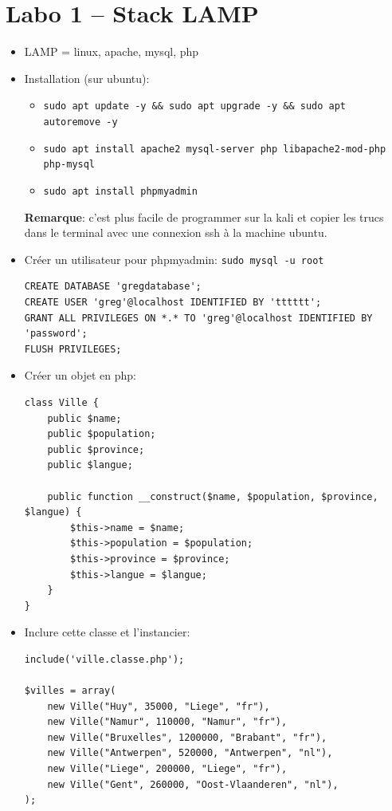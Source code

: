 \documentclass[a4paper]{article}
\begin{document}
\section{Labo 1 -- Stack LAMP}





\begin{itemize}


\item LAMP = linux, apache, mysql, php


\item Installation (sur ubuntu):
\begin{itemize}
    \item \texttt{sudo apt update -y \&\& sudo apt upgrade -y \&\& sudo apt autoremove -y}
    \item \texttt{sudo apt install apache2 mysql-server php  libapache2-mod-php php-mysql}
    \item \texttt{sudo apt install phpmyadmin}
\end{itemize}
\textbf{Remarque}: c'est plus facile de programmer sur la kali et copier les trucs dans le terminal avec une connexion ssh à la machine ubuntu.


\item Créer un utilisateur pour phpmyadmin: \texttt{sudo mysql -u root}
\begin{lstlisting}[style=sql]
CREATE DATABASE 'gregdatabase';
CREATE USER 'greg'@localhost IDENTIFIED BY 'tttttt';
GRANT ALL PRIVILEGES ON *.* TO 'greg'@localhost IDENTIFIED BY 'password';
FLUSH PRIVILEGES;
\end{lstlisting}


\item Créer un objet en php:
\begin{lstlisting}[style=php]
class Ville {
	public $name;
	public $population;
	public $province;
	public $langue;

	public function __construct($name, $population, $province, $langue) {
		$this->name = $name;
		$this->population = $population;
		$this->province = $province;
		$this->langue = $langue;
	}
}
\end{lstlisting}


\item Inclure cette classe et l'instancier:
\begin{lstlisting}[style=php]
include('ville.classe.php');

$villes = array(
	new Ville("Huy", 35000, "Liege", "fr"),
	new Ville("Namur", 110000, "Namur", "fr"),
	new Ville("Bruxelles", 1200000, "Brabant", "fr"),
	new Ville("Antwerpen", 520000, "Antwerpen", "nl"),
	new Ville("Liege", 200000, "Liege", "fr"),
	new Ville("Gent", 260000, "Oost-Vlaanderen", "nl"),
);


\end{lstlisting}
\end{itemize}
\end{document}
